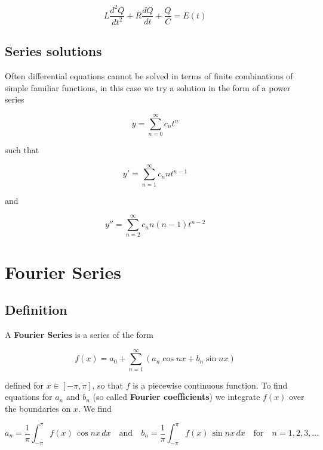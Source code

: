 \documentclass[a4paper]{article}
\begin{document}
\begin{equation}
    L\frac{d^2Q}{dt^2}+R\frac{dQ}{dt}+\frac{Q}{C}=E(t)
\end{equation}

\subsection{Series solutions}

Often differential equations cannot be solved in terms of finite combinations of simple familiar functions, in this case we try a solution in the form of a power series

\begin{equation*}
    y=\sum_{n=0}^{\infty} c_nt^n
\end{equation*}

such that 

\begin{equation*}
    y'=\sum_{n=1}^{\infty} c_nnt^{n-1}
\end{equation*}

and 

\begin{equation*}
    y''=\sum_{n=2}^{\infty} c_nn(n-1)t^{n-2}
\end{equation*}

\section{Fourier Series}

\subsection{Definition}

A \textbf{Fourier Series} is a series of the form 

\begin{equation*}
    f(x)=a_0 + \sum_{n=1}^{\infty} (a_n\cos nx + b_n\sin nx)
\end{equation*}

defined for $x\in[-\pi, \pi]$, so that $f$ is a piecewise continuous function. To find equations for $a_n$ and $b_n$ (so called \textbf{Fourier coefficients}) we integrate $f(x)$ over the boundaries on $x$. We find

\begin{equation*}
    a_n=\frac{1}{\pi}\int_{-\pi}^{\pi} f(x)\,\cos nx\,dx\quad\text{and}\quad b_n=\frac{1}{\pi}\int_{-\pi}^{\pi} f(x)\,\sin nx\,dx\quad\text{for}\quad n=1, 2, 3,\dots
\end{equation*}
\end{document}
